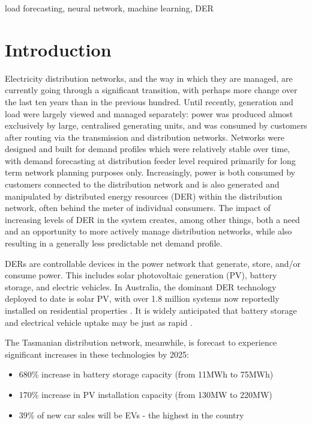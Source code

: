 \documentclass[conference]{IEEEtran}
\begin{document}
\begin{IEEEkeywords}
load forecasting, neural network, machine learning, DER
\end{IEEEkeywords}

\section{Introduction}
Electricity distribution networks, and the way in which they are managed, are currently going through a significant transition, with perhaps more change over the last ten years than in the previous hundred. %
Until recently, generation and load were largely viewed and managed separately: power was produced almost exclusively by large, centralised generating units, and was consumed by customers after routing via %
the transmission and distribution networks. 
Networks were designed and built for demand profiles which were relatively stable over time, with demand forecasting at distribution feeder level required primarily for long term network planning purposes only. 
Increasingly, power is both consumed by customers connected to the distribution network and is also generated and manipulated by distributed energy resources (DER) within the distribution network, often behind the meter of individual consumers. 
The impact of increasing levels of DER in the system creates, among other things, both a need and an opportunity to more actively manage distribution networks, while also resulting in a generally less predictable net demand profile.

DERs are controllable devices in the power network that generate, store, and/or consume power. 
This includes solar photovoltaic generation (PV), battery storage, and electric vehicles. 
In Australia, the dominant DER technology deployed to date is solar PV, with over 1.8 million systems now reportedly installed on residential properties \cite{apvi2017}. 
It is widely anticipated that battery storage and electrical vehicle uptake may be just as rapid \cite{bloomberg2018}.

The Tasmanian distribution network, meanwhile, is forecast to experience significant increases in these technologies by 2025: \\
\begin{itemize}
	\item 680\% increase in battery storage capacity (from 11MWh to 75MWh) \cite{Jacobs2017}
	\item 170\% increase in PV installation capacity (from 130MW to 220MW) \cite{Jacobs2017}
	\item 39\% of new car sales will be EVs - the highest in the country \cite{AEMO2016}
\end{itemize}
\end{document}
